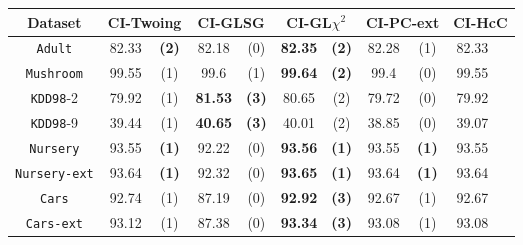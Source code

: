     \begin{table}
    \small
      \centering

\begin{tabular}{c|cc|cc|cc|cc|cc} 
Dataset             & \multicolumn{2}{c|}{CI-Twoing} &   \multicolumn{2}{c|}{CI-GLSG} & \multicolumn{2}{c|}{CI-GL$\chi^2$} & \multicolumn{2}{c|}{CI-PC-ext}& \multicolumn{2}{c}{CI-HcC}\\  \hline   
{\tt Adult}         & 82.33      &  {\bf (2)}        &   82.18      & (0)             & {\bf 82.35} &  {\bf (2)}           & 82.28       & (1)            & 82.33       &             \\
{\tt Mushroom}      & 99.55      &  (1)              &   99.6       & (1)             & {\bf 99.64} &  {\bf (2)}           & 99.4        & (0)            & 99.55       &             \\
{\tt KDD98}-2       & 79.92      &  (1)              &  {\bf 81.53} & {\bf (3)}       &  80.65      &  (2)                 & 79.72       & (0)            & 79.92       &             \\
{\tt KDD98}-9       & 39.44      &  (1)              &  {\bf 40.65} & {\bf (3)}       &  40.01      &  (2)                 & 38.85       & (0)            & 39.07       &             \\
{\tt Nursery}       & 93.55      &  {\bf (1)}        &   92.22      & (0)             & {\bf 93.56} &  {\bf (1)}           & 93.55       & {\bf (1)}      & 93.55       &             \\
{\tt Nursery-ext}   & 93.64      &  {\bf (1)}        &   92.32      & (0)             & {\bf 93.65} &  {\bf (1)}           & 93.64       & {\bf (1)}      & 93.64       &             \\
{\tt Cars}          & 92.74      &  (1)              &   87.19      & (0)             & {\bf 92.92} &  {\bf (3)}           & 92.67       & (1)            & 92.67       &            \\
{\tt Cars-ext}      & 93.12      &  (1)              &   87.38      & (0)             & {\bf 93.34} &  {\bf (3)}           & 93.08       & (1)            & 93.08       &             \\

\end{tabular}
\end{table}
